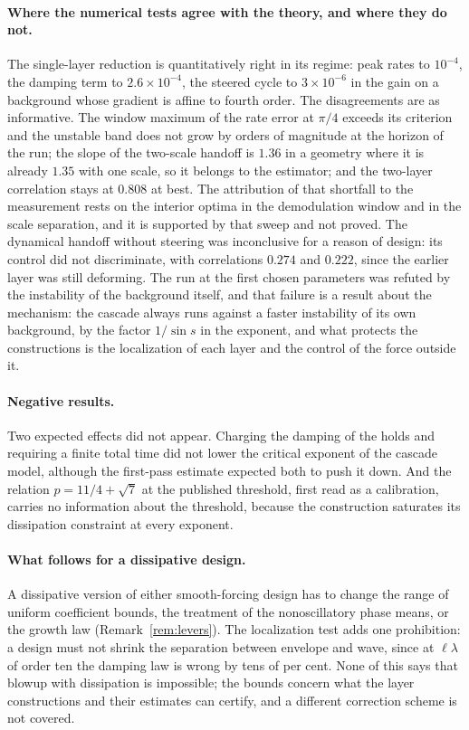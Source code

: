 \documentclass[11pt]{article}
\theoremstyle{remark}
\begin{document}
\paragraph{Where the numerical tests agree with the theory, and where they do not.} The single-layer reduction is
quantitatively right in its regime: peak rates to $10^{-4}$, the damping term to $2.6\times10^{-4}$, the steered cycle to
$3\times10^{-6}$ in the gain on a background whose gradient is affine to fourth order. The disagreements are as
informative. The window maximum of the rate error at $\pi/4$ exceeds its criterion and the unstable band does not grow by
orders of magnitude at the horizon of the run; the slope of the two-scale handoff is $1.36$ in a geometry where it is
already $1.35$ with one scale, so it belongs to the estimator; and the two-layer correlation stays at $0.808$ at best. The
attribution of that shortfall to the measurement rests on the interior optima in the demodulation window and in the scale
separation, and it is supported by that sweep and not proved. The dynamical handoff without steering was inconclusive for a
reason of design: its control did not discriminate, with correlations $0.274$ and $0.222$, since the earlier layer was
still deforming. The run at the first chosen parameters was refuted by the instability of the background itself, and
that failure is a result about the mechanism: the cascade always runs against a faster instability of its own
background, by the factor $1/\sin s$ in the exponent, and what protects the constructions is the localization of each
layer and the control of the force outside it.

\paragraph{Negative results.} Two expected effects did not appear. Charging the damping of the holds and requiring a finite
total time did not lower the critical exponent of the cascade model, although the first-pass estimate expected both to push
it down. And the relation $p=11/4+\sqrt7$ at the published threshold, first read as a calibration, carries no information
about the threshold, because the construction saturates its dissipation constraint at every exponent.

\paragraph{What follows for a dissipative design.} A dissipative version of either smooth-forcing design has to change the range of uniform
coefficient bounds, the treatment of the nonoscillatory phase means, or the growth law (Remark~\ref{rem:levers}). The
localization test adds one prohibition: a design must not shrink the separation between envelope and wave, since at
$\ell\lambda$ of order ten the damping law is wrong by tens of per cent. None of this says that blowup with dissipation is
impossible; the bounds concern what the layer constructions and their estimates can certify, and a different correction
scheme is not covered.
\end{document}
